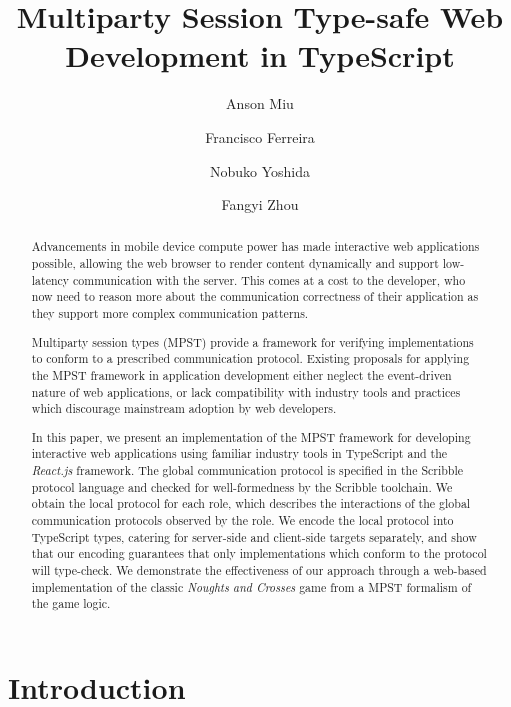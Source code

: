 \documentclass[submission,copyright,creativecommons]{eptcs}
\title{Multiparty Session Type-safe Web Development in TypeScript}
\author{Anson Miu
\institute{Imperial College London}
\and
Francisco Ferreira
\institute{Imperial College London}
\and
Nobuko Yoshida
\institute{Imperial College London}
\and
Fangyi Zhou
\institute{Imperial College London}
}
\begin{document}
\maketitle

\begin{abstract}
Advancements in mobile device compute power has made interactive web applications possible, allowing the web browser to render content dynamically and support low-latency communication with the server. This comes at a cost to the developer, who now need to reason more about the communication correctness of their application as they support more complex communication patterns. 

Multiparty session types (MPST) provide a framework for verifying implementations to conform to a prescribed communication protocol. Existing proposals for applying the MPST framework in application development either neglect the event-driven nature of web applications, or lack compatibility with industry tools and practices which discourage mainstream adoption by web developers.

In this paper, we present an implementation of the MPST framework for developing interactive web applications using familiar industry tools in TypeScript and the \textit{React.js} framework. The global communication protocol is specified in the Scribble protocol language and checked for well-formedness by the Scribble toolchain. We obtain the local protocol for each role, which describes the interactions of the global communication protocols observed by the role. We encode the local protocol into TypeScript types, catering for server-side and client-side targets separately, and show that our encoding guarantees that only implementations which conform to the protocol will type-check. We demonstrate the effectiveness of our approach through a web-based implementation of the classic \textit{Noughts and Crosses} game from a MPST formalism of the game logic.

\end{abstract}

\section{Introduction}
\end{document}
